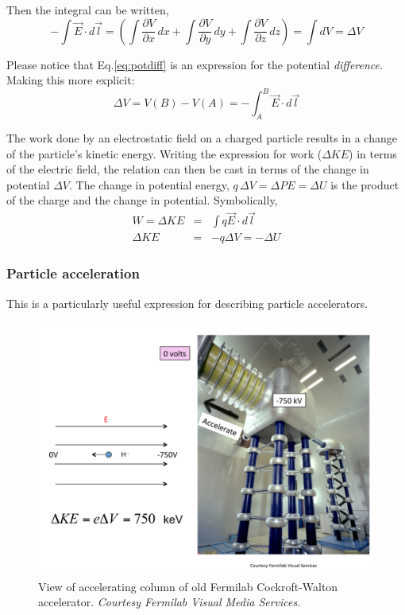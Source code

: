 \documentclass[12pt]{article}
\begin{document}
\begin{flushleft}
Then the integral can be written,
\[
- \int \vec{E} \cdot  d\vec{l} =  \left( \int \frac{\partial V}{\partial x} \, dx +  \int \frac{\partial V}{\partial y} \, dy + \int \frac{\partial V}{\partial z} \, dz \right) =   \int dV = \Delta V
\]

Please notice that Eq.\ref{eq:potdiff} is an expression for the potential {\it difference}.   Making this more explicit:
\begin{equation*}
\Delta V = V(B) - V(A) = - \int_{A}^{B} \vec{E} \cdot  d\vec{l} 
\end{equation*}

The work done by an electrostatic field on a charged particle results in a change of the particle's kinetic energy.  Writing the expression for work ($\Delta KE$) in terms of the electric field, the relation can then be cast in terms of the change in potential $\Delta V$.  The change in potential energy, $q\, \Delta V = \Delta PE =  \Delta U$ is the product of the charge and the change in potential.  Symbolically,
\begin{eqnarray}
W  = \Delta KE& = & \int q\vec{E} \cdot  d\vec{l} \nonumber \\
 \Delta KE & = & -q\Delta V =  -\Delta U \label{eq:eV}
\end{eqnarray}

\subsubsection*{\bf Particle acceleration}

This is a particularly useful expression for describing particle accelerators.

\begin{figure}[h]
\centering
\includegraphics*[trim=.5cm 0cm 1cm 0cm, clip=true, width=0.6\columnwidth]{cockroft.pdf}
\caption{View of accelerating column of old Fermilab Cockroft-Walton accelerator.  {\small \it Courtesy Fermilab Visual Media Services.}}
\label{fig:cockcroft}
\end{figure}


\end{flushleft}
\end{document}
